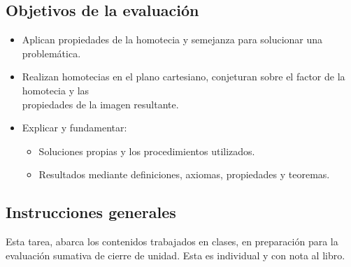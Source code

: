 \documentclass{cdplf-prueba}
\begin{document}
%
\begin{tcbraster}[enhanced,raster columns=3,raster width=\linewidth,raster column skip=3pt,raster force size=false]
    \begin{caja}[title={\sffamily\scshape\bfseries Nombre},height=30pt,add to width=4cm]
    \end{caja}
    \begin{caja}[title={\sffamily\scshape\bfseries Puntaje},height=30pt,add to width=-2cm]
    \end{caja}
    \begin{caja}[title={\sffamily\scshape\bfseries Nota},height=30pt,add to width=-2cm]
    \end{caja}                    
\end{tcbraster}

\subsection*{Objetivos de la evaluación}
\begin{itemize}[]
    \item Aplican propiedades de la homotecia y semejanza para solucionar una \mbox{problemática}.
    \item Realizan homotecias en el plano cartesiano, conjeturan sobre el factor de la homotecia y las 
    \\\mbox{propiedades} de la imagen resultante.
    \item Explicar y fundamentar: 
    \begin{itemize}[]
        \item   Soluciones propias y los procedimientos utilizados.
        \item   Resultados mediante definiciones, axiomas, propiedades y teoremas.
    \end{itemize}
\end{itemize}

\subsection*{Instrucciones generales}

Esta tarea, abarca los contenidos trabajados en clases, en preparación para la 
evaluación sumativa de cierre de unidad. Esta es individual y con nota al libro.
\end{document}
